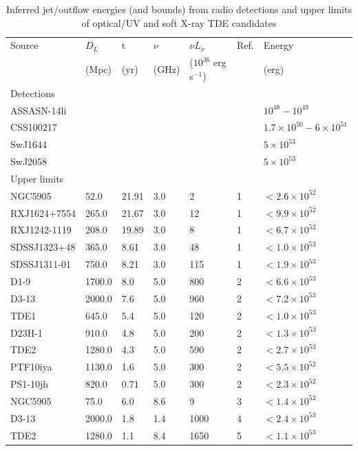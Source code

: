\documentclass[usenatbib,fleqn]{mnras}
\begin{document}
\begin{table}
\begin{threeparttable}
  \caption{\label{tab:enConstr} Inferred jet/outflow energies (and
    bounds) from radio detections and upper limits of optical/UV and
    soft X-ray TDE candidates}
\begin{tabular*}{1.5\columnwidth}{lllllll}
\hline
Source & $D_L$ & t & $\nu$ & $\nu L_{\nu}$ & Ref. & Energy\\
& (Mpc) & (yr) & (GHz) & ($10^{36}$ erg s$^{-1}$) & & (erg) \\
\hline
Detections \\
\hline
ASSASN-14li & & & & & &  $10^{48}-10^{49}$\\
CSS100217 & & & & & & $1.7\times 10^{50}-6\times 10^{51}$\\
SwJ1644 & & & & & & $5\times 10^{53}$\\
SwJ2058 & & & & & & $5\times 10^{53}$\\ 
\hline 
Upper limits & \\
\hline
NGC5905 & 52.0 & 21.91 & 3.0 & 2 & 1 & $< 2.6 \times 10^{ 52 }$ \\
RXJ1624+7554 & 265.0 & 21.67 & 3.0 & 12 & 1 & $< 9.9 \times 10^{ 52 }$ \\
RXJ1242-1119 & 208.0 & 19.89 & 3.0 & 8 & 1 & $< 6.7 \times 10^{ 52 }$ \\
SDSSJ1323+48 & 365.0 & 8.61 & 3.0 & 48 & 1 & $< 1.0 \times 10^{ 53 }$ \\
SDSSJ1311-01 & 750.0 & 8.21 & 3.0 & 115 & 1 & $< 1.9 \times 10^{ 53 }$ \\
D1-9 & 1700.0 & 8.0 & 5.0 & 800 & 2 & $< 6.6 \times 10^{ 53 }$ \\
D3-13 & 2000.0 & 7.6 & 5.0 & 960 & 2 & $< 7.2 \times 10^{ 53 }$ \\
TDE1 & 645.0 & 5.4 & 5.0 & 120 & 2 & $< 1.0 \times 10^{ 53 }$ \\
D23H-1 & 910.0 & 4.8 & 5.0 & 200 & 2 & $< 1.3 \times 10^{ 53 }$ \\
TDE2 & 1280.0 & 4.3 & 5.0 & 590 & 2 & $< 2.7 \times 10^{ 53 }$ \\
PTF10iya & 1130.0 & 1.6 & 5.0 & 300 & 2 & $< 5.5 \times 10^{ 52 }$ \\
PS1-10jh & 820.0 & 0.71 & 5.0 & 300 & 2 & $< 2.3 \times 10^{ 52 }$ \\
NGC5905 & 75.0 & 6.0 & 8.6 & 9 & 3 & $< 1.4 \times 10^{ 52 }$ \\
D3-13 & 2000.0 & 1.8 & 1.4 & 1000 & 4 & $< 2.4 \times 10^{ 53 }$ \\
TDE2 & 1280.0 & 1.1 & 8.4 & 1650 & 5 & $< 1.1 \times 10^{ 53 }$ \\

\end{tabular*}
\end{threeparttable}
\end{table}
\end{document}
